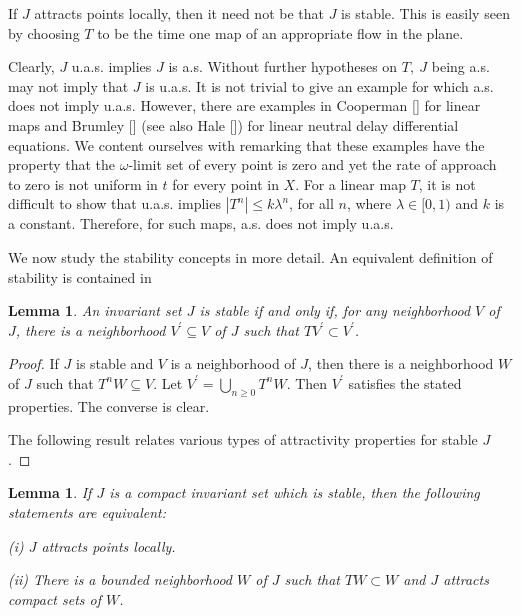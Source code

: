 \documentclass{surv-l}
\theoremstyle{plain}
\newtheorem{lemma}[theorem]{Lemma}
\theoremstyle{definition}
\numberwithin{equation}{section}
\numberwithin{figure}{chapter}
\begin{document}
If $J$ attracts points locally, then it need not be that $J$ is stable. This is easily seen by choosing $T$ to be the time one map of an appropriate flow in the plane.

Clearly, $J$ u.a.s. implies $J$ is a.s. Without further hypotheses on $T,\ J$ being a.s. may not imply that $J$ is u.a.s. It is not trivial to give an example for which a.s. does not imply u.a.s. However, there are examples in Cooperman [\citeyear{1978c}] for linear maps and Brumley [\citeyear{1970b}] (see also Hale [\citeyear{1974h}]) for linear neutral delay differential equations. We content ourselves with remarking that these examples have the property that the $\omega$-limit set of every point is zero and yet the rate of approach to zero is not uniform in $t$ for every point in $X$. For a linear map $T$, it is not difficult to show that u.a.s. implies $|T^{n}|\leq k\lambda^{n}$, for all $n$, where $\lambda \in[0,1)$ and $k$ is a constant. Therefore, for such maps, a.s. does not imply u.a.s.

We now study the stability concepts in more detail. An equivalent definition of stability is contained in

\begin{lemma}\label{lem2.2.1} An invariant set $J$ is stable if and only if, for any neighborhood $V$ of $J$, there is a neighborhood $V^{\prime}\subseteq V$ of $J$ such that $TV^{\prime}\subset V^{\prime}$.
\end{lemma}

\begin{proof}
If $J$ is stable and $V$ is a neighborhood of $J$, then there is a neighborhood $W$ of $J$ such that $T^{n}W\subseteq V$. Let $V^{\prime}=\bigcup_{n\geq 0}T^{n}W$. Then $V^{\prime}$ satisfies the stated properties. The converse is clear.

The following result relates various types of attractivity properties for stable $J$.
\end{proof}

\begin{lemma}\label{lem2.2.2} If $J$ is a compact invariant set which is stable, then the
following statements are equivalent:

\emph{(i)} $J$ attracts points locally.

\emph{(ii)} There is a bounded neighborhood $W$ of $J$ such that $TW\subset W$ and $J$ attracts compact sets of $W$.
\end{lemma}
\end{document}
